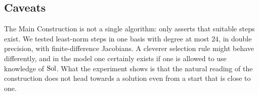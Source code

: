 \subsection*{Caveats}
The Main Construction is not a single algorithm: \paper{} only asserts that suitable steps
exist. We tested least-norm steps in one basis with degree at most $24$, in double precision,
with finite-difference Jacobians. A cleverer selection rule might behave differently, and in the
model one certainly exists if one is allowed to use knowledge of $\operatorname{Sol}$. What the experiment
shows is that the natural reading of the construction does not head towards a solution even
from a start that is close to one.
